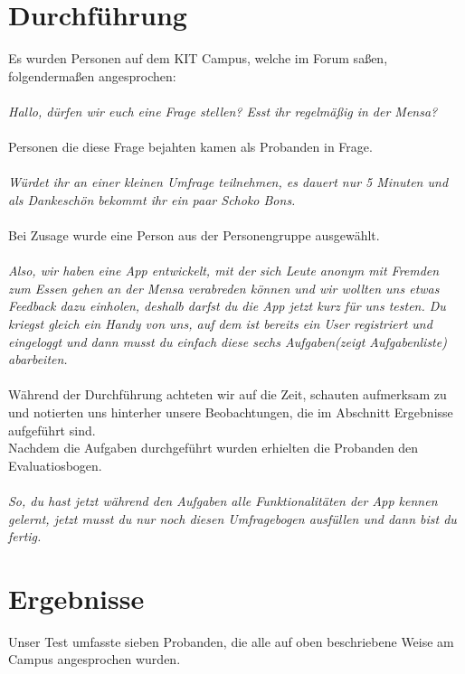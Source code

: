 \documentclass[a4paper]{scrreprt}
\begin{document}
\section{Durchführung}
Es wurden Personen auf dem KIT Campus, welche im Forum saßen, folgendermaßen angesprochen: \\
\ \\
\textit{Hallo, dürfen wir euch eine Frage stellen? Esst ihr regelmäßig in der Mensa?} \\ 
\ \\
Personen die diese Frage bejahten kamen als Probanden in Frage. \\
\ \\
\textit{Würdet ihr an einer kleinen Umfrage teilnehmen, es dauert nur 5 Minuten und als Dankeschön bekommt ihr ein paar Schoko Bons.}  \\ 
\ \\
Bei Zusage wurde eine Person aus der Personengruppe ausgewählt.\\
\ \\
\textit{Also, wir haben eine App entwickelt, mit der sich Leute anonym mit Fremden zum Essen gehen an der Mensa verabreden können und wir wollten uns etwas Feedback dazu einholen, deshalb darfst du die App jetzt kurz für uns testen. Du kriegst gleich ein Handy von uns, auf dem ist bereits ein User registriert und eingeloggt und dann musst du einfach diese sechs Aufgaben(zeigt Aufgabenliste) abarbeiten.} \\
\ \\
Während der Durchführung achteten wir auf die Zeit, schauten aufmerksam zu und notierten uns hinterher unsere Beobachtungen, die im Abschnitt Ergebnisse aufgeführt sind. \\
Nachdem die Aufgaben durchgeführt wurden erhielten die Probanden den Evaluatiosbogen.\\
\ \\
\textit{So, du hast jetzt während den Aufgaben alle Funktionalitäten der App kennen gelernt, jetzt musst du nur noch diesen Umfragebogen ausfüllen und dann bist du fertig.}

\newpage
\section{Ergebnisse}
Unser Test umfasste sieben Probanden, die alle auf oben beschriebene Weise am Campus angesprochen wurden.
\end{document}
